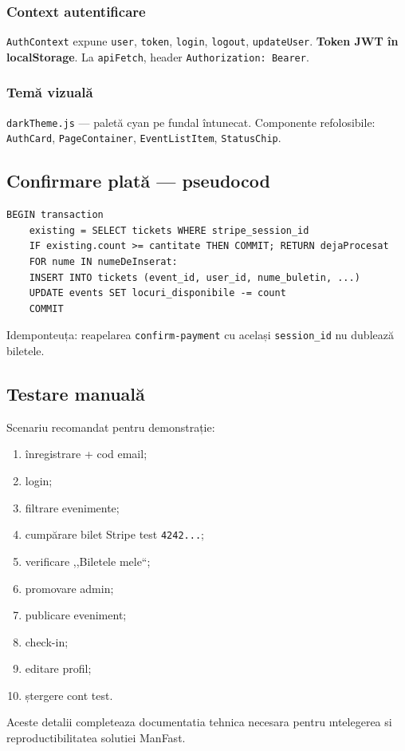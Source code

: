 \subsubsection{Context autentificare}
\texttt{AuthContext} expune \texttt{user}, \texttt{token}, \texttt{login}, \texttt{logout}, \texttt{updateUser}. \textbf{Token JWT în localStorage}. La \texttt{apiFetch}, header \texttt{Authorization: Bearer}.

\subsubsection{Temă vizuală}
\texttt{darkTheme.js} — paletă cyan pe fundal întunecat. Componente refolosibile: \texttt{AuthCard}, \texttt{PageContainer}, \texttt{EventListItem}, \texttt{StatusChip}.


\subsection{Confirmare plată — pseudocod}

\begin{lstlisting}[mathescape=true]
	BEGIN transaction
	existing = SELECT tickets WHERE stripe_session_id
	IF existing.count >= cantitate THEN COMMIT; RETURN dejaProcesat
	FOR nume IN numeDeInserat:
	INSERT INTO tickets (event_id, user_id, nume_buletin, ...)
	UPDATE events SET locuri_disponibile -= count
	COMMIT
\end{lstlisting}

\noindent Idemponteuța: reapelarea \texttt{confirm-payment} cu același \texttt{session\_id} nu dublează biletele.


\subsection{Testare manuală}

Scenariu recomandat pentru demonstrație:
\begin{enumerate}
	\item înregistrare + cod email;
	\item login;
	\item filtrare evenimente;
	\item cumpărare bilet Stripe test \texttt{4242...};
	\item verificare ,,Biletele mele``;
	\item promovare admin;
	\item publicare eveniment;
	\item check-in;
	\item editare profil;
	\item ștergere cont test.
\end{enumerate}

Aceste detalii completeaza documentatia tehnica necesara pentru ıntelegerea si reproductibilitatea solutiei ManFast.